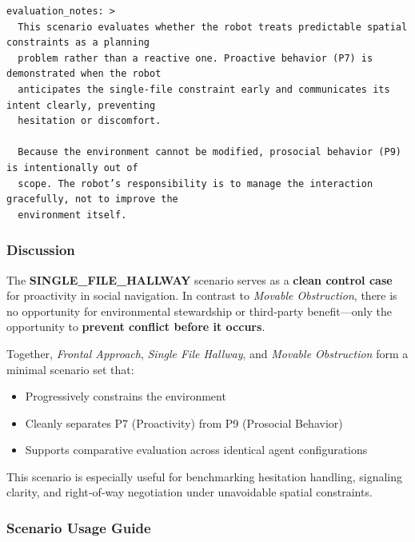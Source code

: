 \documentclass[utf8]{frontiers_suppmat} %
\providecommand{\tightlist}{%
  \setlength{\itemsep}{0pt}\setlength{\parskip}{0pt}}
\begin{document}
\begin{lstlisting}[style=literatecard]
evaluation_notes: >
  This scenario evaluates whether the robot treats predictable spatial constraints as a planning
  problem rather than a reactive one. Proactive behavior (P7) is demonstrated when the robot
  anticipates the single-file constraint early and communicates its intent clearly, preventing
  hesitation or discomfort.

  Because the environment cannot be modified, prosocial behavior (P9) is intentionally out of
  scope. The robot’s responsibility is to manage the interaction gracefully, not to improve the
  environment itself.
\end{lstlisting}

\subsubsection{Discussion}\label{discussion}

The \textbf{SINGLE\_FILE\_HALLWAY} scenario serves as a \textbf{clean
control case} for proactivity in social navigation. In contrast to
\emph{Movable Obstruction}, there is no opportunity for environmental
stewardship or third‑party benefit---only the opportunity to
\textbf{prevent conflict before it occurs}.

Together, \emph{Frontal Approach}, \emph{Single File Hallway}, and
\emph{Movable Obstruction} form a minimal scenario set that:

\begin{itemize}
\tightlist
\item
  Progressively constrains the environment
\item
  Cleanly separates P7 (Proactivity) from P9 (Prosocial Behavior)
\item
  Supports comparative evaluation across identical agent configurations
\end{itemize}

This scenario is especially useful for benchmarking hesitation handling,
signaling clarity, and right‑of‑way negotiation under unavoidable
spatial constraints.

\subsubsection{Scenario Usage Guide}\label{scenario-usage-guide}
\end{document}
